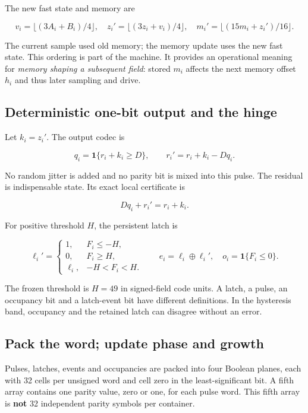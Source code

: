 \documentclass[11pt,a4paper]{article}
\begin{document}
The new fast state and memory are

\[
v_i=\lfloor(3A_i+B_i)/4\rfloor,\quad
z_i'=\lfloor(3z_i+v_i)/4\rfloor,\quad
m_i'=\lfloor(15m_i+z_i')/16\rfloor.
\]

The current sample used old memory; the memory update uses the new fast
state. This ordering is part of the machine. It provides an operational
meaning for \emph{memory shaping a subsequent field}: stored \(m_i\)
affects the next memory offset \(h_i\) and thus later sampling and
drive.

\subsection{Deterministic one-bit output and the
hinge}\label{deterministic-one-bit-output-and-the-hinge}

Let \(k_i=z_i'\). The output codec is

\[
q_i=\mathbf1\{r_i+k_i\ge D\},\qquad
r_i'=r_i+k_i-Dq_i.
\]

No random jitter is added and no parity bit is mixed into this pulse.
The residual is indispensable state. Its exact local certificate is

\[
\boxed{Dq_i+r_i'=r_i+k_i.}
\]

For positive threshold \(H\), the persistent latch is

\[
\ell_i'=\begin{cases}
1,&F_i\le-H,\\
0,&F_i\ge H,\\
\ell_i,&-H<F_i<H.
\end{cases}
\qquad
 e_i=\ell_i\oplus\ell_i',\quad o_i=\mathbf1\{F_i\le0\}.
\]

The frozen threshold is \(H=49\) in signed-field code units. A latch, a
pulse, an occupancy bit and a latch-event bit have different
definitions. In the hysteresis band, occupancy and the retained latch
can disagree without an error.

\subsection{Pack the word; update phase and
growth}\label{pack-the-word-update-phase-and-growth}

Pulses, latches, events and occupancies are packed into four Boolean
planes, each with 32 cells per unsigned word and cell zero in the
least-significant bit. A fifth array contains one parity value, zero or
one, for each pulse word. This fifth array is \textbf{not} 32
independent parity symbols per container.
\end{document}
